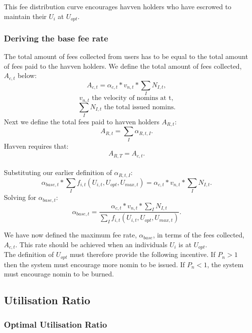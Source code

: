 \noindent This fee distribution curve encourages havven holders who have escrowed to maintain their $U_i$ at $U_{opt}$.  \\

\newpage

\subsubsection{Deriving the base fee rate} The total amount of fees collected from users has to be equal to the total amount of fees paid to the havven holders. We define the total amount of fees collected, $A_{c,t}$ below: \\
$$ A_{c,t}  = \alpha_{c,t} * v_{n,t} * \sum\limits_I N_{I,t}, $$
$$ v_{n,t} \text{ the velocity of nomins at t}, $$
$$  \sum\limits_I N_{I,t} \text{ the total issued nomins}. $$
Next we define the total fees paid to havven holders $A_{R,t}$: \\
$$ A_{R,t} = \sum\limits_I \alpha_{R,t,I}. $$
Havven requires that: \\
$$ A_{R,T} =  A_{c,t}. $$ \\
Substituting our earlier definition of $\alpha_{R,t,I}$: \\
$$ \alpha_{base,t} *\sum\limits_I f_{i,t}(U_{i,t}, U_{opt}, U_{max,t}) =  \alpha_{c,t} * v_{n,t} * \sum\limits_I N_{I,t}. $$
Solving for $\alpha_{base,t}$:\\
$$ \alpha_{base,t} = \frac{\alpha_{c,t} * v_{n,t} * \sum\limits_I N_{I,t}}{\sum\limits_I f_{i,t}(U_{i,t}, U_{opt}, U_{max,t})}.$$

\noindent We have now defined the maximum fee rate, $\alpha_{base}$, in terms of the fees collected, $A_{c,t}$. This rate should be achieved when an individuals $U_i$ is at $U_{opt}$. \\

\noindent The definition of $U_{opt}$ must therefore provide the following incentive. If $P_n > 1$ then the system must encourage more nomin to be issued. If $P_n < 1$, the system must encourage nomin to be burned. 

\newpage

\subsection{Utilisation Ratio}
\subsubsection{Optimal Utilisation Ratio}

